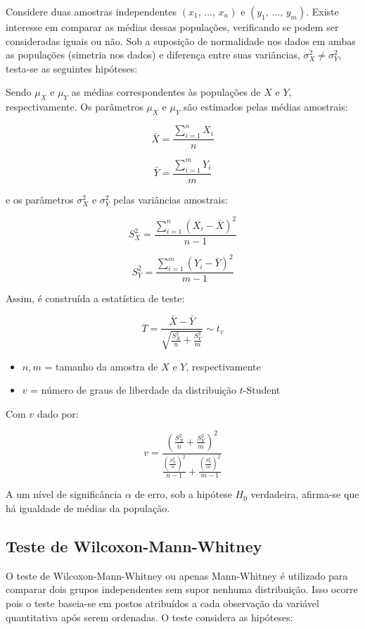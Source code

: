 \documentclass[
]{estat/estat}
\providecommand{\tightlist}{%
  \setlength{\itemsep}{0pt}\setlength{\parskip}{0pt}}\usepackage{longtable,booktabs,array}
\begin{document}
Considere duas amostras independentes \((x_1,\, \ldots , \, x_n)\) e
\((y_1,\, \ldots , \, y_m)\). Existe interesse em comparar as médias
dessas populações, verificando se podem ser consideradas iguais ou não.
Sob a suposição de normalidade nos dados em ambas as populações
(simetria nos dados) e diferença entre suas variâncias,
\(\sigma_X^2 \neq \sigma_Y^2\), testa-se as seguintes hipóteses:


Sendo \(\mu_X\) e \(\mu_Y\) as médias correspondentes às populações de
\(X\) e \(Y\), respectivamente. Os parâmetros \(\mu_X\) e \(\mu_Y\) são
estimados pelas médias amostrais:

\[
\bar{X} = \frac{\sum_{i=1}^{n} X_i}{n}
\]

\[
\bar{Y} = \frac{\sum_{i=1}^{m} Y_i}{m}
\]

e os parâmetros \(\sigma_X^2\) e \(\sigma_Y^2\) pelas variâncias
amostrais:

\[
S_X^2 = \frac{\sum_{i=1}^{n}(X_i - \bar{X})^2}{n - 1}
\]

\[
S_Y^2 = \frac{\sum_{i=1}^{m}(Y_i - \bar{Y})^2}{m - 1}
\]

Assim, é construída a estatística de teste:

\[
T = \frac{\bar{X} - \bar{Y}}{\sqrt{\frac{S_X^2}{n} + \frac{S_Y^2}{m}}} \sim t_v
\]

\begin{itemize}
\tightlist
\item
  \(n, m\) = tamanho da amostra de \(X\) e \(Y\), respectivamente
\item
  \(v\) = número de graus de liberdade da distribuição \(t\)-Student
\end{itemize}

Com \(v\) dado por:

\[
v = \frac{\left(\frac{S_X^2}{n} + \frac{S_Y^2}{m}\right)^2}{\frac{\left(\frac{S_X^2}{n}\right)^2}{n - 1} + \frac{\left(\frac{S_Y^2}{m}\right)^2}{m - 1}}
\]

A um nível de significância \(\alpha\) de erro, sob a hipótese \(H_{0}\)
verdadeira, afirma-se que há igualdade de médias da população.

\subsection{Teste de
Wilcoxon-Mann-Whitney}\label{teste-de-wilcoxon-mann-whitney}

O teste de Wilcoxon-Mann-Whitney ou apenas Mann-Whitney é utilizado para
comparar dois grupos independentes sem supor nenhuma distribuição. Isso
ocorre pois o teste baseia-se em postos atribuídos a cada observação da
variável quantitativa após serem ordenadas. O teste considera as
hipóteses:
\end{document}
